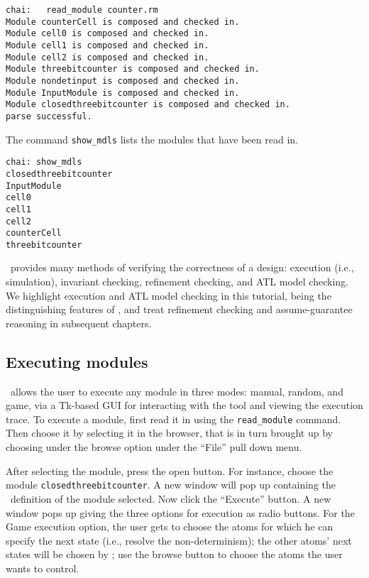 \begin{verbatim}
chai:   read_module counter.rm
Module counterCell is composed and checked in.
Module cell0 is composed and checked in.
Module cell1 is composed and checked in.
Module cell2 is composed and checked in.
Module threebitcounter is composed and checked in.
Module nondetinput is composed and checked in.
Module InputModule is composed and checked in.
Module closedthreebitcounter is composed and checked in.
parse successful.
\end{verbatim}

The command {\tt show\_mdls} lists the modules that have been read
in. 

\begin{verbatim}
chai: show_mdls
closedthreebitcounter
InputModule         
cell0               
cell1               
cell2               
counterCell         
threebitcounter     
\end{verbatim}

\chai\ provides many methods of verifying the correctness of a design:
execution (i.e., simulation), invariant checking, refinement checking,
and ATL model checking. We highlight execution and ATL model checking
in this tutorial, being the distinguishing features of \chai, and
treat refinement checking and assume-guarantee reasoning in subsequent
chapters. 

\subsection{Executing modules}
\chai\ allows the user to execute any module in three modes: manual,
random, and game, via a Tk-based GUI for interacting with the tool and
viewing the execution trace. To execute a module, first read it in
using the {\tt read\_module} command. Then choose it by selecting it in the
browser, that is in turn brought up by choosing under the browse
option under the ``File'' pull down menu. 

After selecting the module, press the open button. For instance,
choose the module {\tt closedthreebitcounter}. A new window will pop
up containing the\\ \rem\ definition of the module selected. Now click
the ``Execute'' button. A new window pops up giving the three options
for execution as radio buttons. For the Game execution option, the
user gets to choose the atoms for which he can specify the next state
(i.e., resolve the non-determinism); the other atoms' next states will
be chosen by \chai; use the browse button to choose the atoms the
user wants to control. 

